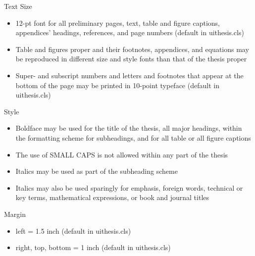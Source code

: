 \noindent Text Size
\begin{itemize}
\item 12-pt font for all preliminary pages, text, table and figure captions,
appendices\textquoteright{} headings, references, and page numbers
(default in uithesis.cls)
\item Table and figures proper and their footnotes, appendices, and equations
may be reproduced in different size and style fonts than that of the
thesis proper
\item Super- and subscript numbers and letters and footnotes that appear
at the bottom of the page may be printed in 10-point typeface (default
in uithesis.cls)
\end{itemize}
Style
\begin{itemize}
\item Boldface may be used for the title of the thesis, all major headings,
within the formatting scheme for subheadings, and for all table or
all figure captions
\item The use of SMALL CAPS is not allowed within any part of the thesis
\item Italics may be used as part of the subheading scheme
\item Italics may also be used sparingly for emphasis, foreign words, technical
or key terms, mathematical expressions, or book and journal titles
\end{itemize}
Margin
\begin{itemize}
\item left = 1.5 inch (default in uithesis.cls)
\item right, top, bottom = 1 inch (default in uithesis.cls)
\end{itemize}
~

